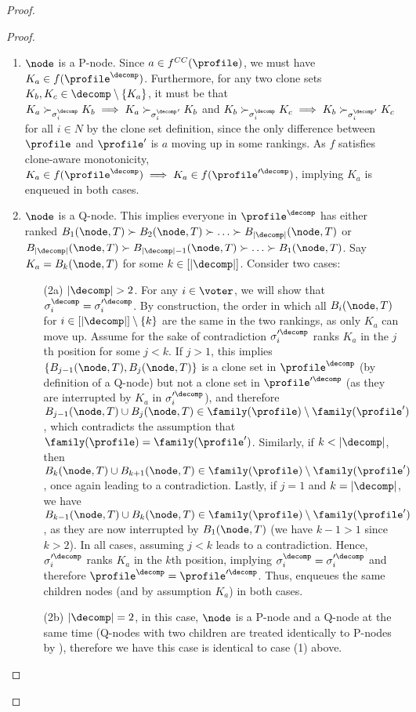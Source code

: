 \begin{proof}
\begin{proof}
    \begin{enumerate}
        \item $\node$ is a P-node. Since $a \in f^{CC}(\profile)$, we must have $K_a \in f(\profile^\decomp)$. Furthermore, for any two clone sets $K_b, K_c \in \decomp \setminus \{K_a\}$, it must be that $K_a \succ_{\sigma_i^\decomp} K_b \implies K_a \succ_{{\sigma_i^\decomp}'} K_b$ and 
        $K_b \succ_{\sigma_i^\decomp} K_c \implies K_b \succ_{{\sigma_i^\decomp}'} K_c$ for all $i \in N$ by the clone set definition, since the only difference between $\profile$ and $\profile'$ is $a$ moving up in some rankings. As $f$ satisfies clone-aware monotonicity, $K_a \in f(\profile^\decomp) \implies K_a \in f({\profile'^\decomp})$, implying $K_a$ is enqueued in both cases.
        \item $\node$ is a Q-node. This implies everyone in $\profile^\decomp$ has either ranked $B_1(\node, T) \succ B_2(\node, T) \succ \ldots \succ B_{|\decomp|}(\node,T)$ or $B_{|\decomp|}(\node, T) \succ B_{|\decomp|-1}(\node, T) \succ \ldots \succ B_{1}(\node,T)$. Say $K_a = B_{k}(\node,T)$ for some $k \in [|\decomp|]$. Consider two cases:
        \begin{itemize}
            \item[(2a)] $|\decomp|>2$. For any $i \in \voter$, we will show that  $\sigma_i^\decomp= \sigma_i'^{\decomp}$. By construction, the order in which all $B_{i}(\node, T)$ for $i \in [|\decomp|]\setminus \{k\}$ are the same in the two rankings, as only $K_a$ can move up. Assume for the sake of contradiction $\sigma_{i}'^{\decomp}$ ranks $K_a$ in the $j$th position for some $j<k$. If $j>1$, this implies $\{B_{j-1}(\node,T), B_{j}(\node,T)\}$ is a clone set in $\profile^\decomp$ (by definition of a Q-node) but not a clone set in $\profile'^{\decomp}$ (as they are interrupted by $K_a$ in $\sigma_i'^{\decomp}$), and therefore $ B_{j-1}(\node,T) \cup B_{j}(\node,T) \in \family(\profile) \setminus \family(\profile')$, which contradicts the assumption that $\family(\profile)=\family(\profile')$. Similarly, if $k < |\decomp|$, then $ B_{k}(\node,T) \cup B_{k+1}(\node,T) \in \family(\profile) \setminus  \family(\profile')$, once again leading to a contradiction. Lastly, if $j=1$ and $k=|\decomp|$, we have  $ B_{k-1}(\node,T) \cup B_{k}(\node,T) \in \family(\profile) \setminus  \family(\profile')$, as they are now interrupted by $B_1(\node, T)$ (we have $k-1>1$ since $k>2$). In all cases, assuming $j<k$ leads to a contradiction. Hence,   $\sigma_{i}'^{\decomp}$ ranks $K_a$ in the $k$th position, implying $\sigma_i^\decomp= \sigma_i'^{\decomp}$ and therefore $\profile^\decomp= \profile'^{\decomp}$. Thus,  enqueues the same children nodes (and by assumption $K_a$) in both cases. 
            \item[(2b)] $|\decomp|=2$, in this case, $\node$ is a P-node and a Q-node at the same time (Q-nodes with two children are treated identically to P-nodes by ), therefore we have this case is identical to case (1) above.
        \end{itemize}
    \end{enumerate}


\end{proof}
\end{proof}
